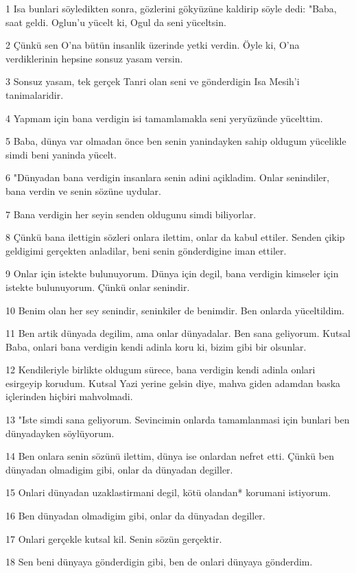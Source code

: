\par 1 Isa bunlari söyledikten sonra, gözlerini gökyüzüne kaldirip söyle dedi: "Baba, saat geldi. Oglun'u yücelt ki, Ogul da seni yüceltsin.
\par 2 Çünkü sen O'na bütün insanlik üzerinde yetki verdin. Öyle ki, O'na verdiklerinin hepsine sonsuz yasam versin.
\par 3 Sonsuz yasam, tek gerçek Tanri olan seni ve gönderdigin Isa Mesih'i tanimalaridir.
\par 4 Yapmam için bana verdigin isi tamamlamakla seni yeryüzünde yücelttim.
\par 5 Baba, dünya var olmadan önce ben senin yanindayken sahip oldugum yücelikle simdi beni yaninda yücelt.
\par 6 "Dünyadan bana verdigin insanlara senin adini açikladim. Onlar senindiler, bana verdin ve senin sözüne uydular.
\par 7 Bana verdigin her seyin senden oldugunu simdi biliyorlar.
\par 8 Çünkü bana ilettigin sözleri onlara ilettim, onlar da kabul ettiler. Senden çikip geldigimi gerçekten anladilar, beni senin gönderdigine iman ettiler.
\par 9 Onlar için istekte bulunuyorum. Dünya için degil, bana verdigin kimseler için istekte bulunuyorum. Çünkü onlar senindir.
\par 10 Benim olan her sey senindir, seninkiler de benimdir. Ben onlarda yüceltildim.
\par 11 Ben artik dünyada degilim, ama onlar dünyadalar. Ben sana geliyorum. Kutsal Baba, onlari bana verdigin kendi adinla koru ki, bizim gibi bir olsunlar.
\par 12 Kendileriyle birlikte oldugum sürece, bana verdigin kendi adinla onlari esirgeyip korudum. Kutsal Yazi yerine gelsin diye, mahva giden adamdan baska içlerinden hiçbiri mahvolmadi.
\par 13 "Iste simdi sana geliyorum. Sevincimin onlarda tamamlanmasi için bunlari ben dünyadayken söylüyorum.
\par 14 Ben onlara senin sözünü ilettim, dünya ise onlardan nefret etti. Çünkü ben dünyadan olmadigim gibi, onlar da dünyadan degiller.
\par 15 Onlari dünyadan uzaklastirmani degil, kötü olandan* korumani istiyorum.
\par 16 Ben dünyadan olmadigim gibi, onlar da dünyadan degiller.
\par 17 Onlari gerçekle kutsal kil. Senin sözün gerçektir.
\par 18 Sen beni dünyaya gönderdigin gibi, ben de onlari dünyaya gönderdim.
